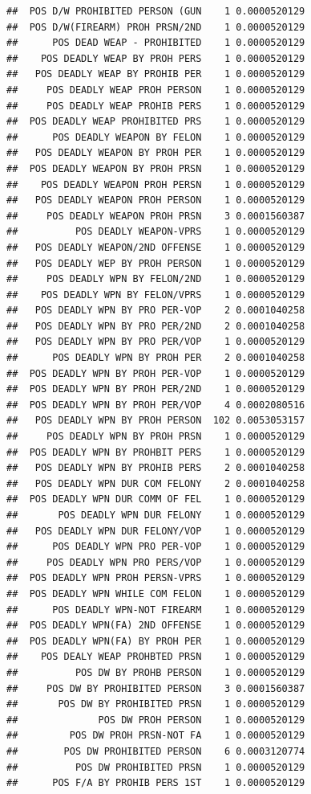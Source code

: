 \documentclass[]{book}
\begin{document}
\begin{verbatim}
##  POS D/W PROHIBITED PERSON (GUN    1 0.0000520129
##  POS D/W(FIREARM) PROH PRSN/2ND    1 0.0000520129
##      POS DEAD WEAP - PROHIBITED    1 0.0000520129
##    POS DEADLY WEAP BY PROH PERS    1 0.0000520129
##   POS DEADLY WEAP BY PROHIB PER    1 0.0000520129
##     POS DEADLY WEAP PROH PERSON    1 0.0000520129
##     POS DEADLY WEAP PROHIB PERS    1 0.0000520129
##  POS DEADLY WEAP PROHIBITED PRS    1 0.0000520129
##      POS DEADLY WEAPON BY FELON    1 0.0000520129
##   POS DEADLY WEAPON BY PROH PER    1 0.0000520129
##  POS DEADLY WEAPON BY PROH PRSN    1 0.0000520129
##    POS DEADLY WEAPON PROH PERSN    1 0.0000520129
##   POS DEADLY WEAPON PROH PERSON    1 0.0000520129
##     POS DEADLY WEAPON PROH PRSN    3 0.0001560387
##          POS DEADLY WEAPON-VPRS    1 0.0000520129
##   POS DEADLY WEAPON/2ND OFFENSE    1 0.0000520129
##   POS DEADLY WEP BY PROH PERSON    1 0.0000520129
##     POS DEADLY WPN BY FELON/2ND    1 0.0000520129
##    POS DEADLY WPN BY FELON/VPRS    1 0.0000520129
##   POS DEADLY WPN BY PRO PER-VOP    2 0.0001040258
##   POS DEADLY WPN BY PRO PER/2ND    2 0.0001040258
##   POS DEADLY WPN BY PRO PER/VOP    1 0.0000520129
##      POS DEADLY WPN BY PROH PER    2 0.0001040258
##  POS DEADLY WPN BY PROH PER-VOP    1 0.0000520129
##  POS DEADLY WPN BY PROH PER/2ND    1 0.0000520129
##  POS DEADLY WPN BY PROH PER/VOP    4 0.0002080516
##   POS DEADLY WPN BY PROH PERSON  102 0.0053053157
##     POS DEADLY WPN BY PROH PRSN    1 0.0000520129
##  POS DEADLY WPN BY PROHBIT PERS    1 0.0000520129
##   POS DEADLY WPN BY PROHIB PERS    2 0.0001040258
##   POS DEADLY WPN DUR COM FELONY    2 0.0001040258
##  POS DEADLY WPN DUR COMM OF FEL    1 0.0000520129
##       POS DEADLY WPN DUR FELONY    1 0.0000520129
##   POS DEADLY WPN DUR FELONY/VOP    1 0.0000520129
##      POS DEADLY WPN PRO PER-VOP    1 0.0000520129
##     POS DEADLY WPN PRO PERS/VOP    1 0.0000520129
##  POS DEADLY WPN PROH PERSN-VPRS    1 0.0000520129
##  POS DEADLY WPN WHILE COM FELON    1 0.0000520129
##      POS DEADLY WPN-NOT FIREARM    1 0.0000520129
##  POS DEADLY WPN(FA) 2ND OFFENSE    1 0.0000520129
##  POS DEADLY WPN(FA) BY PROH PER    1 0.0000520129
##    POS DEALY WEAP PROHBTED PRSN    1 0.0000520129
##          POS DW BY PROHB PERSON    1 0.0000520129
##     POS DW BY PROHIBITED PERSON    3 0.0001560387
##       POS DW BY PROHIBITED PRSN    1 0.0000520129
##              POS DW PROH PERSON    1 0.0000520129
##         POS DW PROH PRSN-NOT FA    1 0.0000520129
##        POS DW PROHIBITED PERSON    6 0.0003120774
##          POS DW PROHIBITED PRSN    1 0.0000520129
##      POS F/A BY PROHIB PERS 1ST    1 0.0000520129

\end{verbatim}
\end{document}
